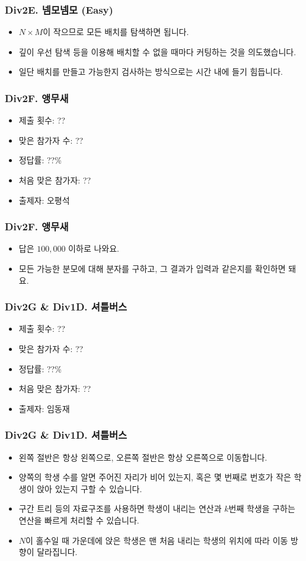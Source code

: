 \documentclass[xetex]{beamer}
\begin{document}
\begin{frame}
  \frametitle{Div2E. 넴모넴모 (Easy)}
  \begin{itemize}
    \item $N \times M$이 작으므로 모든 배치를 탐색하면 됩니다.
    \item 깊이 우선 탐색 등을 이용해 배치할 수 없을 때마다 커팅하는 것을 의도했습니다.
    \item 일단 배치를 만들고 가능한지 검사하는 방식으로는 시간 내에 들기 힘듭니다.
  \end{itemize}
\end{frame}

\begin{frame}
  \frametitle{Div2F. 앵무새}
  \begin{itemize}
    \item 제출 횟수: ??
    \item 맞은 참가자 수: ??
    \item 정답률: ??\%
    \item 처음 맞은 참가자: ??
    \item 출제자: 오평석
  \end{itemize}
\end{frame}

\begin{frame}
  \frametitle{Div2F. 앵무새}
  \begin{itemize}
    \item 답은 $100,000$ 이하로 나와요.
    \item 모든 가능한 분모에 대해 분자를 구하고, 그 결과가 입력과 같은지를 확인하면 돼요.
  \end{itemize}
\end{frame}

\begin{frame}
  \frametitle{Div2G \& Div1D. 셔틀버스}
  \begin{itemize}
    \item 제출 횟수: ??
    \item 맞은 참가자 수: ??
    \item 정답률: ??\%
    \item 처음 맞은 참가자: ??
    \item 출제자: 임동재
  \end{itemize}
\end{frame}

\begin{frame}
  \frametitle{Div2G \& Div1D. 셔틀버스}
  \begin{itemize}
    \item 왼쪽 절반은 항상 왼쪽으로, 오른쪽 절반은 항상 오른쪽으로 이동합니다.
    \item 양쪽의 학생 수를 알면 주어진 자리가 비어 있는지, 혹은 몇 번째로 번호가 작은 학생이 앉아 있는지 구할 수 있습니다.
    \item 구간 트리 등의 자료구조를 사용하면 학생이 내리는 연산과 $k$번째 학생을 구하는 연산을 빠르게 처리할 수 있습니다.
    \item $N$이 홀수일 때 가운데에 앉은 학생은 맨 처음 내리는 학생의 위치에 따라 이동 방향이 달라집니다.
  \end{itemize}
\end{frame}
\end{document}

